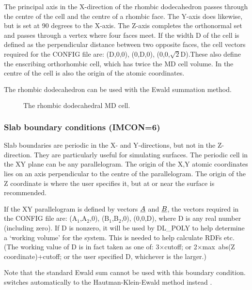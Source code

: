The principal axis in the X-direction of the rhombic dodecahedron
passes through the centre of the cell and the centre of a rhombic
face. The Y-axis does likewise, but is set at 90 degrees to the
X-axis.  The Z-axis completes the orthonormal set and passes through a
vertex where four faces meet. If the width D of the cell is defined as
the perpendicular distance between two opposite faces, the cell
vectors required for the \D{} CONFIG file are: (D,0,0), (0,D,0),
(0,0,$\sqrt{2}$D).These also define the enscribing orthorhombic cell,
which has twice the MD cell volume.  In \D{} the centre of the cell is
also the origin of the atomic coordinates.

The rhombic dodecahedron can be used with the Ewald summation
method.

\begin{figure}[ht]
\begin{center}
\centerline{}
\caption{The rhombic dodecahedral MD cell.}
\end{center}
\end{figure}

\subsubsection*{Slab boundary conditions (IMCON=6)}

Slab boundaries are periodic in the X- and Y-directions, but not in
the Z-direction. They are particularly useful for simulating surfaces.
The periodic cell in the XY plane can be any parallelogram. The origin
of the X,Y atomic coordinates lies on an axis perpendicular to the
centre of the parallelogram. The origin of the Z coordinate is where
the user specifies it, but at or near the surface is recommended.

If the XY parallelogram is defined by vectors $\mbox{$\underline{A}$}$ and $\mbox{$\underline{B}$}$,
the vectors required in the CONFIG file are: (A$_{1}$,A$_{2}$,0),
(B$_{1}$,B$_{2}$,0), (0,0,D), where D is any real number (including
zero). If D is nonzero, it will be used by DL\_POLY to help determine
a `working volume' for the system. This is needed to help calculate
RDFs etc. (The working value of D is in fact taken as one of:
3$\times$cutoff; or 2$\times$max~abs(Z coordinate)+cutoff; or the user
specified D, whichever is the larger.)

Note that the standard Ewald sum cannot be used with this boundary
condition. \D{} switches automatically to the Hautman-Klein-Ewald method
instead \cite{hautman-92a}.  

